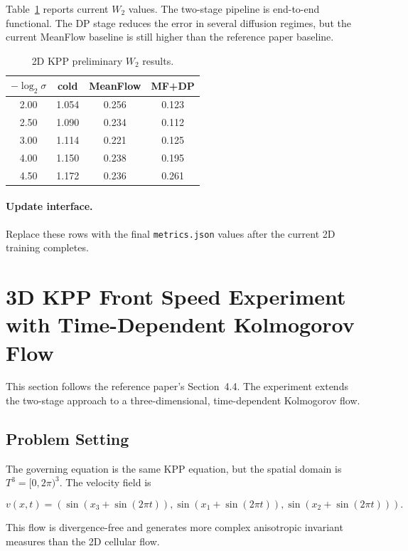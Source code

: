 \documentclass[11pt]{article}
\begin{document}
Table~\ref{tab:2d} reports current \(W_2\) values. The two-stage pipeline is
end-to-end functional. The DP stage reduces the error in several diffusion
regimes, but the current MeanFlow baseline is still higher than the reference
paper baseline.

\begin{table}[htbp]
\centering
\caption{2D KPP preliminary \(W_2\) results.}
\label{tab:2d}
\begin{tabular}{cccc}
\toprule
\(-\log_2\sigma\) & cold & MeanFlow & MF+DP \\
\midrule
2.00 & 1.054 & 0.256 & 0.123 \\
2.50 & 1.090 & 0.234 & 0.112 \\
3.00 & 1.114 & 0.221 & 0.125 \\
4.00 & 1.150 & 0.238 & 0.195 \\
4.50 & 1.172 & 0.236 & 0.261 \\
\bottomrule
\end{tabular}
\end{table}

\paragraph{Update interface.}
Replace these rows with the final \texttt{metrics.json} values after the
current 2D training completes.

\section{3D KPP Front Speed Experiment with Time-Dependent Kolmogorov Flow}

This section follows the reference paper's Section~4.4. The experiment extends
the two-stage approach to a three-dimensional, time-dependent Kolmogorov flow.

\subsection{Problem Setting}

The governing equation is the same KPP equation, but the spatial domain is
\(T^3=[0,2\pi)^3\). The velocity field is

\begin{equation}
v(x,t)=\left(
\sin(x_3+\sin(2\pi t)),
\sin(x_1+\sin(2\pi t)),
\sin(x_2+\sin(2\pi t))
\right).
\end{equation}

This flow is divergence-free and generates more complex anisotropic invariant
measures than the 2D cellular flow.
\end{document}
